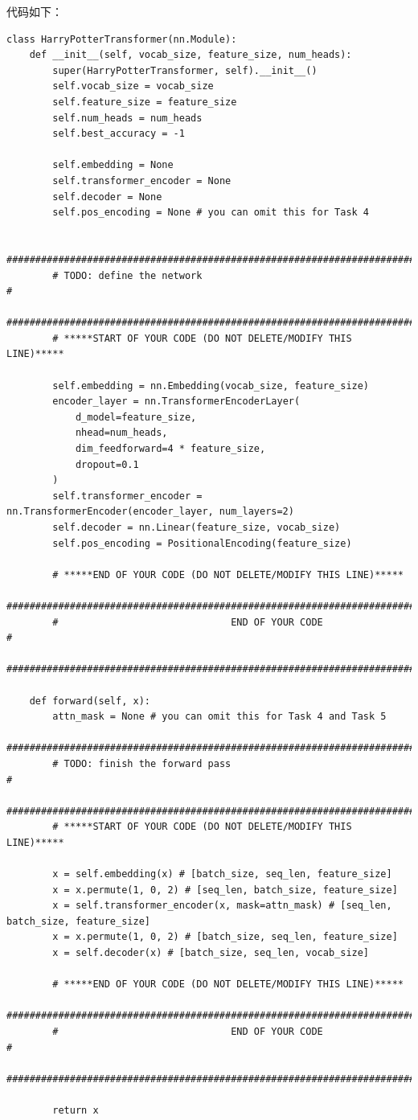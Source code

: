 \documentclass{article}%
\begin{document}
代码如下：
\begin{lstlisting}
class HarryPotterTransformer(nn.Module):
    def __init__(self, vocab_size, feature_size, num_heads):
        super(HarryPotterTransformer, self).__init__()
        self.vocab_size = vocab_size
        self.feature_size = feature_size
        self.num_heads = num_heads
        self.best_accuracy = -1

        self.embedding = None
        self.transformer_encoder = None
        self.decoder = None
        self.pos_encoding = None # you can omit this for Task 4

        ################################################################################
        # TODO: define the network                                                     #
        ################################################################################
        # *****START OF YOUR CODE (DO NOT DELETE/MODIFY THIS LINE)*****

        self.embedding = nn.Embedding(vocab_size, feature_size)
        encoder_layer = nn.TransformerEncoderLayer(
            d_model=feature_size,
            nhead=num_heads,
            dim_feedforward=4 * feature_size,
            dropout=0.1
        )
        self.transformer_encoder = nn.TransformerEncoder(encoder_layer, num_layers=2)
        self.decoder = nn.Linear(feature_size, vocab_size)
        self.pos_encoding = PositionalEncoding(feature_size)

        # *****END OF YOUR CODE (DO NOT DELETE/MODIFY THIS LINE)*****
        ################################################################################
        #                              END OF YOUR CODE                                #
        ################################################################################

    def forward(self, x):        
        attn_mask = None # you can omit this for Task 4 and Task 5
        ################################################################################
        # TODO: finish the forward pass                                                #
        ################################################################################
        # *****START OF YOUR CODE (DO NOT DELETE/MODIFY THIS LINE)*****

        x = self.embedding(x) # [batch_size, seq_len, feature_size]
        x = x.permute(1, 0, 2) # [seq_len, batch_size, feature_size]
        x = self.transformer_encoder(x, mask=attn_mask) # [seq_len, batch_size, feature_size]
        x = x.permute(1, 0, 2) # [batch_size, seq_len, feature_size]
        x = self.decoder(x) # [batch_size, seq_len, vocab_size]

        # *****END OF YOUR CODE (DO NOT DELETE/MODIFY THIS LINE)*****
        ################################################################################
        #                              END OF YOUR CODE                                #
        ################################################################################

        return x
\end{lstlisting}
\end{document}
